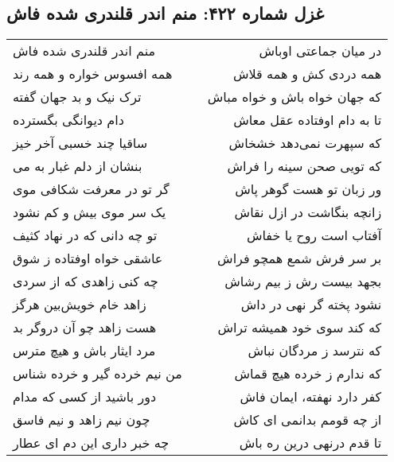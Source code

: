 \begin{center}
\section*{غزل شماره ۴۲۲: منم اندر قلندری شده فاش}
\label{sec:422}
\begin{longtable}{l p{0.5cm} r}
منم اندر قلندری شده فاش
&&
در میان جماعتی اوباش
\\
همه افسوس خواره و همه رند
&&
همه دردی کش و همه قلاش
\\
ترک نیک و بد جهان گفته
&&
که جهان خواه باش و خواه مباش
\\
دام دیوانگی بگسترده
&&
تا به دام اوفتاده عقل معاش
\\
ساقیا چند خسبی آخر خیز
&&
که سپهرت نمی‌دهد خشخاش
\\
بنشان از دلم غبار به می
&&
که تویی صحن سینه را فراش
\\
گر تو در معرفت شکافی موی
&&
ور زبان تو هست گوهر پاش
\\
یک سر موی بیش و کم نشود
&&
زانچه بنگاشت در ازل نقاش
\\
تو چه دانی که در نهاد کثیف
&&
آفتاب است روح یا خفاش
\\
عاشقی خواه اوفتاده ز شوق
&&
بر سر فرش شمع همچو فراش
\\
چه کنی زاهدی که از سردی
&&
بجهد بیست رش ز بیم رشاش
\\
زاهد خام خویش‌بین هرگز
&&
نشود پخته گر نهی در داش
\\
هست زاهد چو آن دروگر بد
&&
که کند سوی خود همیشه تراش
\\
مرد ایثار باش و هیچ مترس
&&
که نترسد ز مردگان نباش
\\
من نیم خرده گیر و خرده شناس
&&
که ندارم ز خرده هیچ قماش
\\
دور باشید از کسی که مدام
&&
کفر دارد نهفته، ایمان فاش
\\
چون نیم زاهد و نیم فاسق
&&
از چه قومم بدانمی ای کاش
\\
چه خبر داری این دم ای عطار
&&
تا قدم درنهی درین ره باش
\\
\end{longtable}
\end{center}
